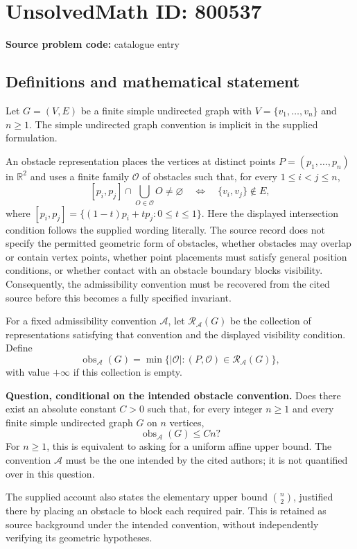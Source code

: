 \documentclass[11pt]{article}
\newcommand{\R}{\mathbb{R}}
\begin{document}
\section*{UnsolvedMath ID: 800537}
\textbf{Source problem code:} catalogue entry
\subsection{Definitions and mathematical statement}
Let \(G=(V,E)\) be a finite simple undirected graph with \(V=\{v_1,\ldots,v_n\}\) and \(n\geq 1\). The simple undirected graph convention is implicit in the supplied formulation.

An obstacle representation places the vertices at distinct points \(P=(p_1,\ldots,p_n)\) in \(\R^2\) and uses a finite family \(\mathcal O\) of obstacles such that, for every \(1\leq i<j\leq n\),
\[
 [p_i,p_j]\cap\bigcup_{O\in\mathcal O}O\neq\varnothing
 \quad\Longleftrightarrow\quad
 \{v_i,v_j\}\notin E,
\]
where \([p_i,p_j]=\{(1-t)p_i+tp_j:0\leq t\leq 1\}\). Here the displayed intersection condition follows the supplied wording literally. The source record does not specify the permitted geometric form of obstacles, whether obstacles may overlap or contain vertex points, whether point placements must satisfy general position conditions, or whether contact with an obstacle boundary blocks visibility. Consequently, the admissibility convention must be recovered from the cited source before this becomes a fully specified invariant.

For a fixed admissibility convention \(\mathcal A\), let \(\mathcal R_{\mathcal A}(G)\) be the collection of representations satisfying that convention and the displayed visibility condition. Define
\[
 \operatorname{obs}_{\mathcal A}(G)
 =\min\{\lvert\mathcal O\rvert:(P,\mathcal O)\in\mathcal R_{\mathcal A}(G)\},
\]
with value \(+\infty\) if this collection is empty.

\textbf{Question, conditional on the intended obstacle convention.} Does there exist an absolute constant \(C>0\) such that, for every integer \(n\geq1\) and every finite simple undirected graph \(G\) on \(n\) vertices,
\[
 \operatorname{obs}_{\mathcal A}(G)\leq Cn?
\]
For \(n\geq1\), this is equivalent to asking for a uniform affine upper bound. The convention \(\mathcal A\) must be the one intended by the cited authors; it is not quantified over in this question.

The supplied account also states the elementary upper bound \(\binom n2\), justified there by placing an obstacle to block each required pair. This is retained as source background under the intended convention, without independently verifying its geometric hypotheses.
\end{document}
